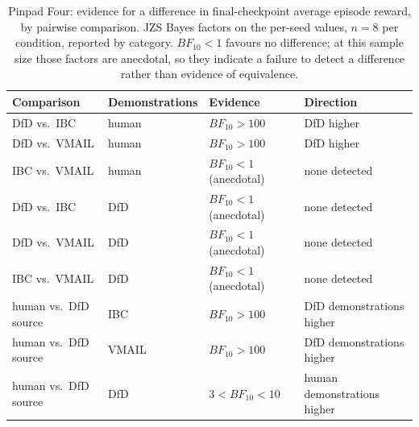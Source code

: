\begin{table}[t]
\centering
\caption{Pinpad Four: evidence for a difference in final-checkpoint average episode reward, by pairwise
comparison. JZS Bayes factors on the per-seed values, $n=8$ per condition, reported by category.
$BF_{10} < 1$ favours no difference; at this sample size those factors are anecdotal, so they indicate a
failure to detect a difference rather than evidence of equivalence.}
\label{tab:results_pinpad_bf}
\begin{tabular}{llll}
\toprule
Comparison & Demonstrations & Evidence & Direction \\
\midrule
DfD vs.\ IBC   & human & $BF_{10} > 100$ & DfD higher \\
DfD vs.\ VMAIL & human & $BF_{10} > 100$ & DfD higher \\
IBC vs.\ VMAIL & human & $BF_{10} < 1$ (anecdotal) & none detected \\
\addlinespace[2pt]
DfD vs.\ IBC   & DfD & $BF_{10} < 1$ (anecdotal) & none detected \\
DfD vs.\ VMAIL & DfD & $BF_{10} < 1$ (anecdotal) & none detected \\
IBC vs.\ VMAIL & DfD & $BF_{10} < 1$ (anecdotal) & none detected \\
\addlinespace[2pt]
human vs.\ DfD source & IBC   & $BF_{10} > 100$ & DfD demonstrations higher \\
human vs.\ DfD source & VMAIL & $BF_{10} > 100$ & DfD demonstrations higher \\
human vs.\ DfD source & DfD   & $3 < BF_{10} < 10$ & human demonstrations higher \\
\bottomrule
\end{tabular}
\end{table}
